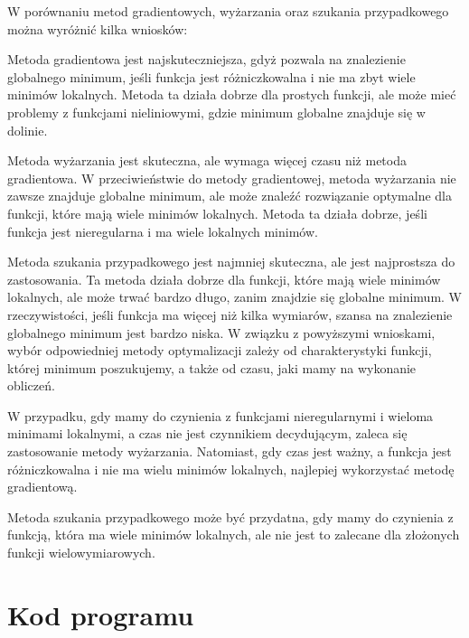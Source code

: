 \documentclass{article}
\begin{document}
W porównaniu metod gradientowych, wyżarzania oraz szukania 
przypadkowego można wyróżnić kilka wniosków:

Metoda gradientowa jest najskuteczniejsza, gdyż pozwala na znalezienie 
globalnego minimum, jeśli funkcja jest różniczkowalna i nie ma zbyt 
wiele minimów lokalnych. Metoda ta działa dobrze dla prostych funkcji, 
ale może mieć problemy z funkcjami nieliniowymi, 
gdzie minimum globalne znajduje się w dolinie.

Metoda wyżarzania jest skuteczna, ale wymaga więcej czasu niż metoda 
gradientowa. W przeciwieństwie do metody gradientowej, metoda 
wyżarzania nie zawsze znajduje globalne minimum, ale może znaleźć 
rozwiązanie optymalne dla funkcji, które mają wiele minimów lokalnych. 
Metoda ta działa dobrze, jeśli funkcja jest nieregularna i ma wiele 
lokalnych minimów.

Metoda szukania przypadkowego jest najmniej skuteczna, ale jest najprostsza do 
zastosowania. Ta metoda działa dobrze dla funkcji, które mają wiele 
minimów lokalnych, ale może trwać bardzo długo, zanim znajdzie się 
globalne minimum. W rzeczywistości, jeśli funkcja ma więcej niż 
kilka wymiarów, szansa na znalezienie globalnego minimum jest bardzo niska.
W związku z powyższymi wnioskami, wybór odpowiedniej metody optymalizacji 
zależy od charakterystyki funkcji, której minimum poszukujemy, 
a także od czasu, jaki mamy na wykonanie obliczeń. 

W przypadku, gdy mamy do czynienia z 
funkcjami nieregularnymi i wieloma minimami lokalnymi, 
a czas nie jest czynnikiem decydującym, zaleca się zastosowanie 
metody wyżarzania. Natomiast, gdy czas jest ważny, a funkcja jest 
różniczkowalna i nie ma wielu minimów lokalnych, najlepiej wykorzystać 
metodę gradientową. 

Metoda szukania przypadkowego może być przydatna, 
gdy mamy do czynienia z funkcją, która ma wiele minimów lokalnych, ale 
nie jest to zalecane dla złożonych funkcji wielowymiarowych.

\section{Kod programu}

\end{document}
